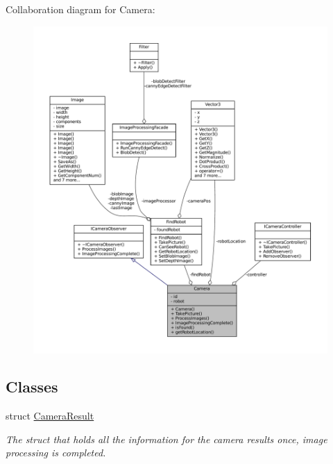 Collaboration diagram for Camera\+:\nopagebreak
\begin{figure}[H]
\begin{center}
\leavevmode
\includegraphics[width=350pt]{classCamera__coll__graph}
\end{center}
\end{figure}
\subsection*{Classes}
\begin{DoxyCompactItemize}
\item 
struct \hyperlink{structCamera_1_1CameraResult}{Camera\+Result}
\begin{DoxyCompactList}\small\item\em The struct that holds all the information for the camera results once, image processing is completed. \end{DoxyCompactList}\end{DoxyCompactItemize}
